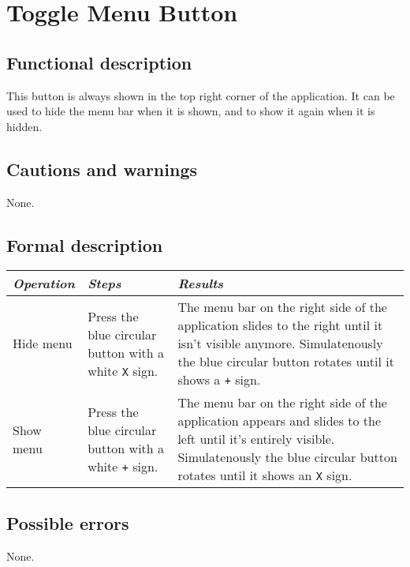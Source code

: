 \section{Toggle Menu Button}
\label{sec:togmenu}
  \subsection*{Functional description}
  This button is always shown in the top right corner of the application. It can be used to hide the menu bar when it is shown, and to show it again when it is hidden.

  \subsection*{Cautions and warnings}
  None.

  \subsection*{Formal description}
  \begin{tabularx}{\textwidth}{XXX}
    \toprule
    \emph{Operation} & \emph{Steps} & \emph{Results} \\
    \midrule
    Hide menu & Press the blue circular button with a white \texttt{X} sign. & The menu bar on the right side of the application slides to the right until it isn't visible anymore. Simulatenously the blue circular button rotates until it shows a \texttt{+} sign.\\
    \midrule
    Show menu & Press the blue circular button with a white \texttt{+} sign. & The menu bar on the right side of the application appears and slides to the left until it's entirely visible. Simulatenously the blue circular button rotates until it shows an \texttt{X} sign. \\
    \bottomrule
\end{tabularx}

  \subsection*{Possible errors}
  None.

